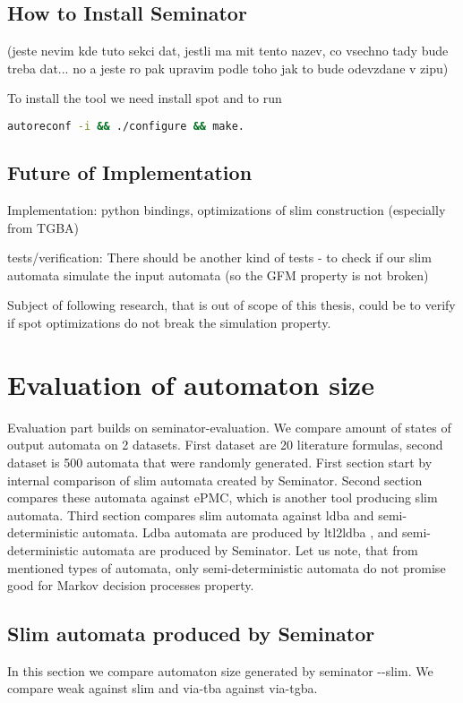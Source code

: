 \documentclass[
	digital
nolof, nolot
]{fithesis3}
\begin{document}
	
	\section{How to Install Seminator}
	(jeste nevim kde tuto sekci dat, jestli ma mit tento nazev, co vsechno tady bude treba dat... no a jeste ro pak upravim podle toho jak to bude odevzdane v zipu)
	
	To install the tool we need install spot and to run 
	
	\begin{lstlisting}[language=bash]
autoreconf -i && ./configure && make.
	\end{lstlisting}
	\section{Future of Implementation}
	Implementation:
	python bindings, optimizations of slim construction (especially from TGBA)
	
	
	
	tests/verification:
	There should be another kind of tests - to check if our slim automata simulate the input automata (so the GFM property is not broken)
	
	Subject of following research, that is out of scope of this thesis, could be to verify if spot optimizations do not break the simulation property. 
	
	\chapter{Evaluation of automaton size}
	Evaluation part builds on seminator-evaluation. We compare amount of states of output automata on 2 datasets. First dataset are 20 literature formulas, second dataset is 500 automata that were randomly generated. First section start by internal comparison of slim automata created by Seminator. Second section compares these automata against ePMC, which is another tool producing slim automata. Third section compares slim automata against ldba and semi-deterministic automata. Ldba automata are produced by ltl2ldba \cite{ltl2ldba}, and semi-deterministic automata are produced by Seminator. Let us note, that from mentioned types of automata, only semi-deterministic automata do not promise good for Markov decision processes property.
	
	\section{Slim automata produced by Seminator}
	In this section we compare automaton size generated by seminator -{}-slim.
	We compare weak against slim and via-tba against via-tgba.
\end{document}
